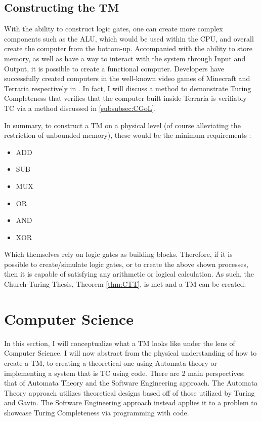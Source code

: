 \subsection{Constructing the TM}\label{subsec:CreateTM}

With the ability to construct logic gates, one can create more complex components such as the ALU, which would be used within the CPU, and overall create the computer from the bottom-up.
Accompanied with the ability to store memory, as well as have a way to interact with the system through Input and Output, it is possible to create a functional computer.
Developers have successfully created computers in the well-known video games of Minecraft and Terraria respectively in \cite{MCTM,TerrariaTM,TerrariaTMGH}.
In fact, I will discuss a method to demonstrate Turing Completeness that verifies that the computer built inside Terraria is verifiably TC via a method discussed in \ref{subsubsec:CGoL}.

In summary, to construct a TM on a physical level (of course alleviating the restriction of unbounded memory), these would be the minimum requirements \cite{nand2tetris,ELTCompSys}:

\begin{itemize}
    \item ADD
    \item SUB
    \item MUX
    \item OR
    \item AND
    \item XOR
\end{itemize}

Which themselves rely on logic gates as building blocks.
Therefore, if it is possible to create/simulate logic gates, or to create the above shown processes, then it is capable of satisfying any arithmetic or logical calculation.
As such, the Church-Turing Thesis, Theorem \ref{thm:CTT}, is met and a TM can be created.

\section{Computer Science}\label{sec:CompSci}

In this section, I will conceptualize what a TM looks like under the lens of Computer Science.
I will now abstract from the physical understanding of how to create a TM, to creating a theoretical one using Automata theory or implementing a system that is TC using code.
There are 2 main perspectives: that of Automata Theory and the Software Engineering approach.
The Automata Theory approach utilizes theoretical designs based off of those utilized by Turing and Gavin.
The Software Engineering approach instead applies it to a problem to showcase Turing Completeness via programming with code.

